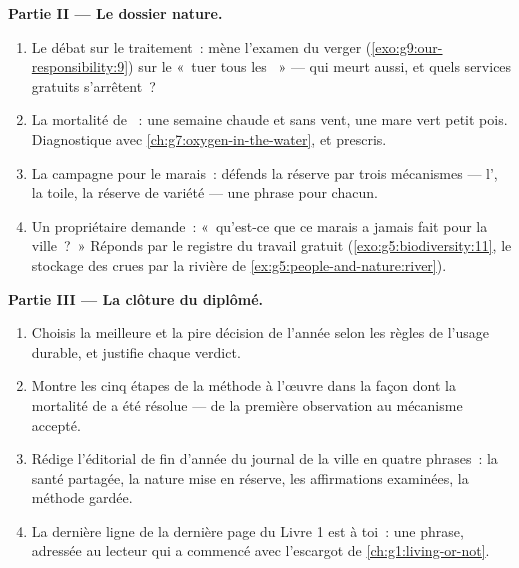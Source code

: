 \begin{problem}
\medskip\noindent\textbf{Partie II --- Le dossier nature.}
\begin{enumerate}[resume]
  \item Le débat sur le traitement~: mène l'examen du
        verger (\cref{exo:g9:our-responsibility:9}) sur le
        «~tuer tous les ~» --- qui meurt aussi, et
        quels services gratuits s'arrêtent~?
  \item La mortalité de ~: une semaine chaude et
        sans vent, une mare vert petit pois. Diagnostique
        avec \cref{ch:g7:oxygen-in-the-water}, et prescris.
  \item La campagne pour le marais~: défends la réserve
        par trois mécanismes --- l', la toile, la
        réserve de variété --- une phrase pour chacun.
  \item Un propriétaire demande~: «~qu'est-ce que ce marais
        a jamais fait pour la ville~?~» Réponds par le
        registre du travail gratuit
        (\cref{exo:g5:biodiversity:11}, le stockage des
        crues par la rivière de
        \cref{ex:g5:people-and-nature:river}).
\end{enumerate}

\medskip\noindent\textbf{Partie III --- La clôture du
diplômé.}
\begin{enumerate}[resume]
  \item Choisis la meilleure et la pire décision de
        l'année selon les règles de l'usage durable, et
        justifie chaque verdict.
  \item Montre les cinq étapes de la méthode à l'œuvre dans
        la façon dont la mortalité de  a été
        résolue --- de la première observation au mécanisme
        accepté.
  \item Rédige l'éditorial de fin d'année du journal de la
        ville en quatre phrases~: la santé partagée, la
        nature mise en réserve, les affirmations examinées,
        la méthode gardée.
  \item La dernière ligne de la dernière page du Livre 1
        est à toi~: une phrase, adressée au lecteur qui a
        commencé avec l'escargot de
        \cref{ch:g1:living-or-not}.
\end{enumerate}
\end{problem}
